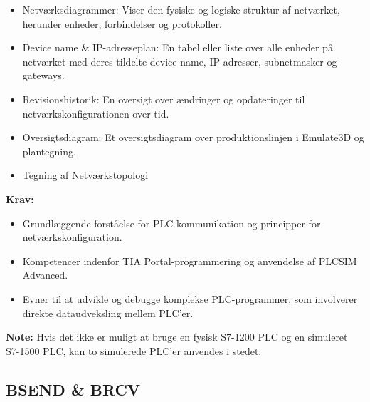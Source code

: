 \begin{enumerate}
\begin{itemize}
		\item Netværksdiagrammer: Viser den fysiske og logiske struktur af netværket, herunder enheder, forbindelser og protokoller.
		\item Device name \& IP-adresseplan: En tabel eller liste over alle enheder på netværket med deres tildelte device name, IP-adresser, subnetmasker og gateways.
		\item Revisionshistorik: En oversigt over ændringer og opdateringer til netværkskonfigurationen over tid.
		\item Oversigtsdiagram: Et oversigtsdiagram over produktionslinjen i Emulate3D og plantegning.
		\item Tegning af Netværkstopologi
	\end{itemize}
\end{enumerate}

\textbf{Krav:}
\begin{itemize}
	\item Grundlæggende forståelse for PLC-kommunikation og principper for netværkskonfiguration.
	\item Kompetencer indenfor TIA Portal-programmering og anvendelse af PLCSIM Advanced.
	\item Evner til at udvikle og debugge komplekse PLC-programmer, som involverer direkte dataudveksling mellem PLC'er.
\end{itemize}
\textbf{Note:} Hvis det ikke er muligt at bruge en fysisk S7-1200 PLC og en simuleret S7-1500 PLC, kan to simulerede PLC'er anvendes i stedet.

\subsection*{BSEND \& BRCV}
\label{subsec:bsend_brcv_plc_communication}

